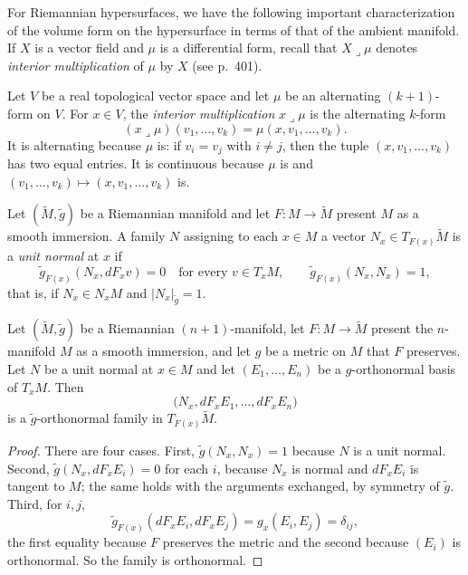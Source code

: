For Riemannian hypersurfaces, we have the following important characterization of the volume form on the hypersurface in terms of that of the ambient manifold. If $X$ is a vector field and $\mu$ is a differential form, recall that $X \lrcorner \mu$ denotes \emph{interior multiplication} of $\mu$ by $X$ (see p.~401).

\begin{definition}
\label{def:interior-multiplication}
\leanok
Let $V$ be a real topological vector space and let $\mu$ be an alternating $(k+1)$-form on $V$.
For $x \in V$, the \emph{interior multiplication} $x \lrcorner \mu$ is the alternating $k$-form
\[
  (x \lrcorner \mu)(v_1, \ldots, v_k) = \mu(x, v_1, \ldots, v_k).
\]
It is alternating because $\mu$ is: if $v_i = v_j$ with $i \ne j$, then the tuple
$(x, v_1, \ldots, v_k)$ has two equal entries. It is continuous because $\mu$ is and
$(v_1,\ldots,v_k) \mapsto (x, v_1, \ldots, v_k)$ is.
\end{definition}

\begin{definition}
\label{def:unit-normal}
\leanok
{}
Let $(\tilde M, \tilde g)$ be a Riemannian manifold and let $F : M \to \tilde M$ present $M$ as a
smooth immersion. A family $N$ assigning to each $x \in M$ a vector $N_x \in T_{F(x)}\tilde M$ is
a \emph{unit normal} at $x$ if
\[
  \tilde g_{F(x)}(N_x, dF_x v) = 0 \quad\text{for every } v \in T_x M,
  \qquad \tilde g_{F(x)}(N_x, N_x) = 1,
\]
that is, if $N_x \in N_x M$ and $|N_x|_{\tilde g} = 1$.
\end{definition}

\begin{lemma}
\label{lem:adapted-frame-cons-normal}
\leanok
{}
Let $(\tilde M, \tilde g)$ be a Riemannian $(n+1)$-manifold, let $F : M \to \tilde M$ present the
$n$-manifold $M$ as a smooth immersion, and let $g$ be a metric on $M$ that $F$ preserves. Let
$N$ be a unit normal at $x \in M$ and let $(E_1, \ldots, E_n)$ be a $g$-orthonormal basis of
$T_x M$. Then
\[
  \bigl(N_x, dF_x E_1, \ldots, dF_x E_n\bigr)
\]
is a $\tilde g$-orthonormal family in $T_{F(x)}\tilde M$.
\end{lemma}

\begin{proof}
\leanok
{}
There are four cases. First, $\tilde g(N_x, N_x) = 1$ because $N$ is a unit normal. Second,
$\tilde g(N_x, dF_x E_i) = 0$ for each $i$, because $N_x$ is normal and $dF_x E_i$ is tangent to
$M$; the same holds with the arguments exchanged, by symmetry of $\tilde g$. Third, for $i, j$,
\[
  \tilde g_{F(x)}(dF_x E_i, dF_x E_j) = g_x(E_i, E_j) = \delta_{ij},
\]
the first equality because $F$ preserves the metric and the second because $(E_i)$ is
orthonormal. So the family is orthonormal.
\end{proof}

